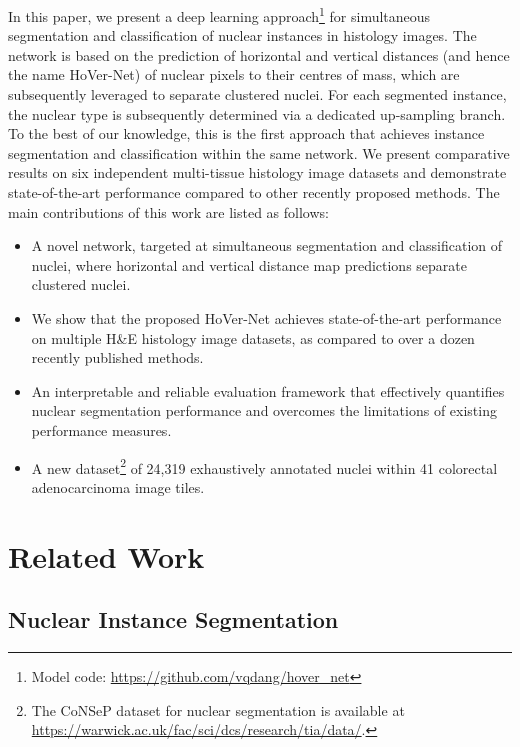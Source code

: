 \documentclass[journal]{IEEEtran}
\begin{document}
    In this paper, we present a deep learning approach\footnote{Model code: \url{https://github.com/vqdang/hover\_net}} for simultaneous segmentation and classification of nuclear instances in histology images. The network is based on the prediction of horizontal and vertical distances (and hence the name HoVer-Net) of nuclear pixels to their centres of mass, which are subsequently leveraged to separate clustered nuclei. For each segmented instance, the nuclear type is subsequently determined via a dedicated up-sampling branch. To the best of our knowledge, this is the first approach that achieves instance segmentation and classification within the same network. We present comparative results on six independent multi-tissue histology image datasets and demonstrate state-of-the-art performance compared to other recently proposed methods. The main contributions of this work are listed as follows:
	
	\begin{itemize}
	    
	    \item A novel network, targeted at simultaneous segmentation and classification of nuclei, where horizontal and vertical distance map predictions separate clustered nuclei.
	    \item We show that the proposed HoVer-Net achieves state-of-the-art performance on multiple H\&E histology image datasets, as compared to over a dozen recently published methods. 
	    \item An interpretable and reliable evaluation framework that effectively quantifies nuclear segmentation performance and overcomes the limitations of existing performance measures.
	    \item A new dataset\footnote{The CoNSeP dataset for nuclear segmentation is available at \url{https://warwick.ac.uk/fac/sci/dcs/research/tia/data/}.} of 24,319 exhaustively annotated nuclei within 41 colorectal adenocarcinoma image tiles. 
	\end{itemize}
	
	\section{Related Work}
	\subsection{Nuclear Instance Segmentation}
	
\end{document}
